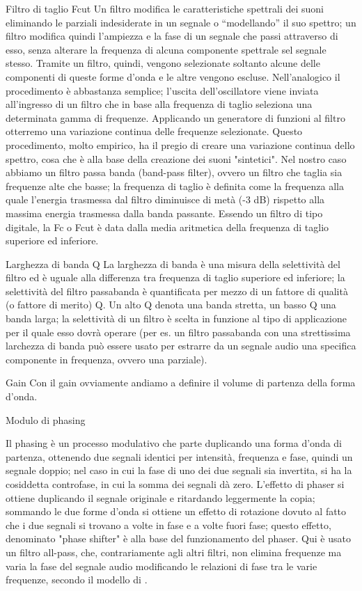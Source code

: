 \documentclass[
	a4paper,
	twocolumn
	]{article}
\begin{document}
Filtro di taglio Fcut
Un filtro modifica le caratteristiche spettrali dei suoni eliminando le
parziali indesiderate in un segnale o “modellando” il suo spettro; un filtro
modifica quindi l’ampiezza e la fase di un segnale che passi attraverso di esso,
senza alterare la frequenza di alcuna componente spettrale sel segnale stesso.
Tramite un filtro, quindi, vengono selezionate soltanto alcune delle componenti
di queste forme d'onda e le altre vengono escluse. Nell'analogico il
procedimento è abbastanza semplice; l'uscita dell'oscillatore viene inviata
all'ingresso di un filtro che in base alla frequenza di taglio seleziona una
determinata gamma di frequenze. Applicando un generatore di funzioni al filtro
otterremo una variazione continua delle frequenze selezionate. Questo
procedimento, molto empirico, ha il pregio di creare una variazione continua
dello spettro, cosa che è alla base della creazione dei suoni "sintetici".
Nel nostro caso abbiamo un filtro passa banda (band-pass filter), ovvero un
filtro che taglia sia frequenze alte che basse; la frequenza di taglio è
definita come la frequenza alla quale l’energia trasmessa dal filtro diminuisce
di metà (-3 dB) rispetto alla massima energia trasmessa dalla banda passante.
Essendo un filtro di tipo digitale, la Fc o Fcut è data dalla media aritmetica
della frequenza di taglio superiore ed inferiore.

Larghezza di banda Q
La larghezza di banda è una misura della selettività del filtro ed è uguale
alla differenza tra frequenza di taglio superiore ed inferiore; la selettività
del filtro passabanda è quantificata per mezzo di un fattore di qualità (o
fattore di merito) Q. Un alto Q denota una banda stretta, un basso Q una banda
larga; la selettività di un filtro è scelta in funzione al tipo di applicazione
per il quale esso dovrà operare (per es. un filtro passabanda con una
strettissima larchezza di banda può essere usato per estrarre da un segnale
audio una specifica componente in frequenza, ovvero una parziale).

Gain
Con il gain ovviamente andiamo a definire il volume di partenza della forma
d’onda.


Modulo di phasing

Il phasing è un processo modulativo che parte duplicando una forma d'onda di
partenza, ottenendo due segnali identici per intensità, frequenza e fase,
quindi un segnale doppio; nel caso in cui la fase di uno dei due segnali sia
invertita, si ha la cosiddetta controfase, in cui la somma dei segnali dà zero.
L'effetto di phaser si ottiene duplicando il segnale originale e ritardando
leggermente la copia; sommando le due forme d'onda si ottiene un effetto di
rotazione dovuto al fatto che i due segnali si trovano a volte in fase e a
volte fuori fase; questo effetto, denominato "phase shifter" è alla base del
funzionamento del phaser. Qui è usato un filtro all-pass, che, contrariamente
agli altri filtri, non elimina frequenze ma varia la fase del segnale audio
modificando le relazioni di fase tra le varie frequenze, secondo il modello di
\cite{cr1996cmt}.
\end{document}
